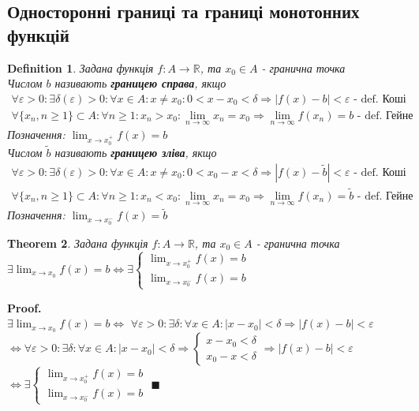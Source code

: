 \documentclass[a4paper, 14pt]{extarticle}
\def\huge{\displaystyle}
\theoremstyle{theoremdd}
\newtheorem{theorem}{Theorem}[subsection]
\theoremstyle{theoremdd}
\newtheorem{definition}[theorem]{Definition}
\theoremstyle{theoremdd}
\theoremstyle{theoremdd}
\theoremstyle{theoremdd}
\theoremstyle{theoremdd}
\theoremstyle{theoremdd}
\theoremstyle{theoremdd}
\newenvironment{pf}{\vspace*{-3mm} \textbf{Proof. \\}}{$\blacksquare$}
\begin{document}
\subsection{Односторонні границі та границі монотонних функцій}
\begin{definition}
Задана функція $f: A \to \mathbb{R}$, та $x_0 \in A$ - гранична точка\\
Числом $b$ називають \textbf{границею справа}, якщо
\begin{align*}
\forall \varepsilon > 0: \exists \delta(\varepsilon)>0: \forall x \in A: x \neq x_0: 0<x-x_0<\delta \Rightarrow |f(x)-b|<\varepsilon \textrm{ - def. Коші}\\
\forall \{x_n,n\geq 1\} \subset A: \forall n \geq 1: x_n > x_0: \lim_{n \to \infty}x_n = x_0 \Rightarrow \lim_{n \to \infty}f(x_n) = b \textrm{ - def. Гейне}
\end{align*}
Позначення: $\huge \lim_{x \to x_0^+} f(x) = b$\\
Числом $\tilde{b}$ називають \textbf{границею зліва}, якщо
\begin{align*}
\forall \varepsilon > 0: \exists \delta(\varepsilon)>0: \forall x \in A: x \neq x_0: 0<x_0-x<\delta \Rightarrow |f(x)-\tilde{b}|<\varepsilon \textrm{ - def. Коші}\\
\forall \{x_n,n\geq 1\} \subset A: \forall n \geq 1: x_n < x_0: \lim_{n \to \infty}x_n = x_0 \Rightarrow \lim_{n \to \infty}f(x_n) = \tilde{b} \textrm{ - def. Гейне}
\end{align*}
Позначення: $\huge \lim_{x \to x_0^-} f(x) = \tilde{b}$
\end{definition}

\begin{theorem}
Задана функція $f: A \to \mathbb{R}$, та $x_0 \in A$ - гранична точка\\
$\exists \huge \lim_{x \to x_0} f(x) = b \iff \exists \begin{cases} \huge \lim_{x \to x_0^+} f(x) = b \\ \huge \lim_{x \to x_0^-} f(x) = b \end{cases}$
\end{theorem}

\begin{pf}
$\exists \huge \lim_{x \to x_0} f(x) = b \iff$
$\forall \varepsilon > 0: \exists \delta: \forall x \in A: |x-x_0|<\delta \Rightarrow |f(x)-b|<\varepsilon$\\
$\iff \forall \varepsilon > 0: \exists \delta: \forall x \in A: |x-x_0|<\delta \Rightarrow \begin{cases} x-x_0<\delta \\ x_0-x<\delta \end{cases} \Rightarrow |f(x)-b|<\varepsilon$ \\ $\iff \exists \begin{cases} \huge \lim_{x \to x_0^+} f(x) = b \\ \huge \lim_{x \to x_0^-} f(x) = b \end{cases}$
\end{pf}
\\
\end{document}
